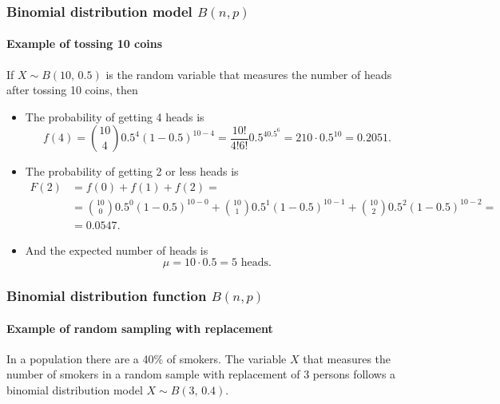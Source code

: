 \begin{frame}
\frametitle{Binomial distribution model $B(n,p)$}
\framesubtitle{Example of tossing 10 coins}
If $X\sim B(10,\,0.5)$ is the random variable that measures the number of heads after tossing 10 coins, then
\begin{itemize}
\item The probability of getting 4 heads is 
\[
f(4) = \binom{10}{4}0.5^4 (1-0.5)^{10-4} = \frac{10!}{4!6!}0.5^40.5^6 = 210\cdot 0.5^{10} = 0.2051.
\]
\item The probability of getting 2 or less heads is
\begin{align*}
F(2) &= f(0) +f(1) + f(2) =\\
&= \binom{10}{0}0.5^0 (1-0.5)^{10-0} + \binom{10}{1}0.5^1 (1-0.5)^{10-1} + \binom{10}{2}0.5^2 (1-0.5)^{10-2} =\\
&= 0.0547.
\end{align*}
\item And the expected number of heads is
\[ \mu = 10\cdot 0.5 = 5 \mbox{ heads}.\]
\end{itemize}
\end{frame}


\begin{frame}
\frametitle{Binomial distribution function $B(n,p)$}
\framesubtitle{Example of random sampling with replacement}
In a population there are a 40\% of smokers. 
The variable $X$ that measures the number of smokers in a random sample with replacement of 3 persons follows a
binomial distribution model $X\sim B(3,\,0.4)$.

\begin{center}
\end{center}

\scalebox{0.8}{
\[
\renewcommand{\arraystretch}{1.5}
\begin{array}{lll}
\uncover<2->{\only<2>{\color{color2}}f(0)=\binom{3}{0}0.4^0(1-0.4)^{3-0}= 0.6^3,} & \quad &
\uncover<3->{\only<3>{\color{color2}}f(1)=\binom{3}{1}0.4^1(1-0.4)^{3-1}= 3\cdot 0.4\cdot 0.6^2,}\\
\uncover<4->{\only<4>{\color{color2}}f(2)=\binom{3}{2}0.4^2(1-0.4)^{3-2}= 3\cdot 0.4^2\cdot 0.6,} & &
\uncover<5->{\only<5>{\color{color2}}f(3)=\binom{3}{3}0.4^3(1-0.4)^{3-3}= 0.4^3.}
\end{array}
\]
}
\end{frame}

